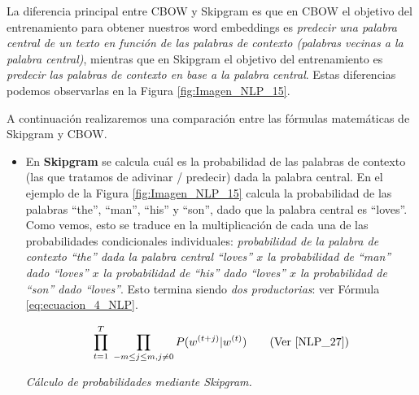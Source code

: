 \documentclass[12pt,a4paper]{article}
\begin{document}
\begin{sloppypar}
\cleardoublepage

La diferencia principal entre CBOW y Skipgram es que en CBOW el objetivo del entrenamiento para obtener nuestros word embeddings es \textit{predecir una palabra central de un texto en función de las palabras de contexto (palabras vecinas a la palabra central)}, mientras que en Skipgram el objetivo del entrenamiento es \textit{predecir las palabras de contexto en base a la palabra central}. Estas diferencias podemos observarlas en la Figura \ref{fig:Imagen_NLP_15}.

A continuación realizaremos una comparación entre las fórmulas matemáticas de Skipgram y CBOW. 
\begin{itemize}

\item En \textbf{Skipgram} se calcula cuál es la probabilidad de las palabras de contexto (las que tratamos de adivinar / predecir) dada la palabra central. En el ejemplo de la  Figura \ref{fig:Imagen_NLP_15} calcula la probabilidad de las palabras “the”, “man”, “his” y “son”, dado que la palabra central es “loves”. Como vemos, esto se traduce en la multiplicación de cada una de las probabilidades condicionales individuales: \textit{probabilidad de la palabra de contexto “the” dada la palabra central “loves” $x$ la probabilidad de “man” dado “loves” $x$ la probabilidad de “his” dado “loves” $x$ la probabilidad de “son” dado “loves”}. Esto termina siendo \textit{dos productorias}: ver Fórmula \ref{eq:ecuacion_4_NLP}. 

\begin{equation}\label{eq:ecuacion_4_NLP}
\prod_{t=1}^{T} \; \prod_{-m \leq j \leq m, j \neq 0}  P(w^{(t+j)} | w^{(t)}) \qquad \text{(Ver \cite{NLP_27})}
\end{equation}
\begin{center}
\textit{Cálculo de probabilidades mediante Skipgram.}
\end{center}


\end{itemize}
\end{sloppypar}
\end{document}
